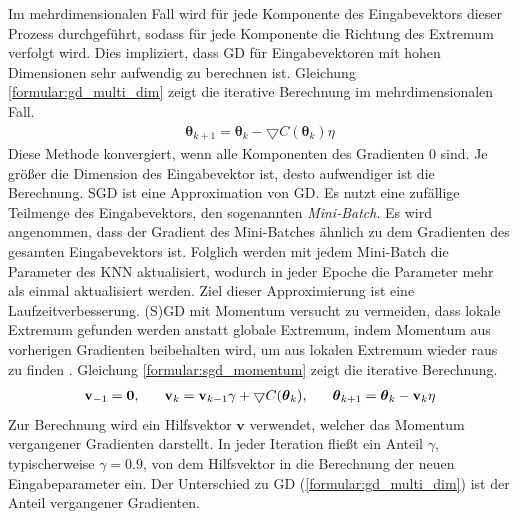 \newline
\newline
Im mehrdimensionalen Fall wird für jede Komponente des Eingabevektors dieser Prozess durchgeführt, sodass für jede Komponente
die Richtung des Extremum verfolgt wird.
Dies impliziert, dass GD für Eingabevektoren mit hohen Dimensionen sehr aufwendig zu berechnen ist.
Gleichung \ref{formular:gd_multi_dim} zeigt die iterative Berechnung im mehrdimensionalen Fall.
\begin{align}
    \label{formular:gd_multi_dim}
    \boldsymbol\theta_{k+1} = \boldsymbol\theta_k - \bigtriangledown C(\boldsymbol\theta_k)\eta
\end{align}
Diese Methode konvergiert, wenn alle Komponenten des Gradienten 0 sind.
Je größer die Dimension des Eingabevektor ist, desto aufwendiger ist die Berechnung.
\newline
\newline
SGD ist eine Approximation von GD. Es nutzt eine zufällige Teilmenge des Eingabevektors, den sogenannten \textit{Mini-Batch}.
Es wird angenommen, dass der Gradient des Mini-Batches ähnlich zu dem Gradienten des gesamten Eingabevektors ist.
Folglich werden mit jedem Mini-Batch die Parameter des KNN aktualisiert, wodurch in jeder Epoche die Parameter mehr als einmal aktualisiert werden.
Ziel dieser Approximierung ist eine Laufzeitverbesserung.
\newline
\newline
(S)GD mit Momentum versucht zu vermeiden, dass lokale Extremum gefunden werden anstatt globale Extremum, indem Momentum aus
vorherigen Gradienten beibehalten wird, um aus lokalen Extremum wieder raus zu finden \cite{higham2019deep}.
Gleichung \ref{formular:sgd_momentum} zeigt die iterative Berechnung.
\begin{align}
    \label{formular:sgd_momentum}
    \textbf{v}_{-1} = \textbf{0}, \hspace{0.6cm} \textbf{v}_k = \textbf{v}_{k-1}\gamma +
    \bigtriangledown C(\boldsymbol\theta_k), \hspace{0.6cm} \boldsymbol\theta_{k+1} = \boldsymbol\theta_k - \textbf{v}_k\eta
\end{align}
Zur Berechnung wird ein Hilfsvektor $\textbf{v}$ verwendet, welcher das Momentum vergangener Gradienten darstellt.
In jeder Iteration fließt ein Anteil $\gamma$, typischerweise $\gamma=0.9$, von dem Hilfsvektor in die Berechnung der neuen Eingabeparameter ein.
Der Unterschied zu GD (\ref{formular:gd_multi_dim}) ist der Anteil vergangener Gradienten.
\newline
